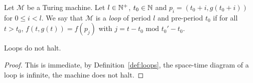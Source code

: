 \begin{definition}[Loops]\label{def:loops}
    Let $\mathcal{M}$ be a Turing machine. Let $l\in\mathbb{N}^+$, $t_0 \in \mathbb{N}$ and $p_i = (t_0+i, g(t_0+i))$ for $0 \leq i < l$. We say that $\mathcal{M}$ is a \textit{loop} of period $l$ and pre-period $t_0$ if for all $t > t_0$, $f(t,g(t)) = f(p_j)$ with $j = t-t_0 \text{ mod } t_0' - t_0$.
\end{definition}

\begin{lemma}
    Loops do not halt.
\end{lemma}
\begin{proof} This is immediate, by Definition~\ref{def:loops}, the space-time diagram of a loop is infinite, the machine does not halt.
\end{proof}
\newpage

